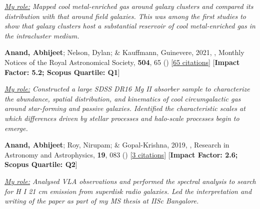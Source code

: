 \vspace{1mm}
\item\textit{\underline{My role:} Mapped cool metal-enriched gas around galaxy clusters and compared its distribution with that around field galaxies. This was among the first studies to show that galaxy clusters host a substantial reservoir of cool metal-enriched gas in the intracluster medium.}
\vspace{1mm}

\item[{\color{numcolor}\scriptsize2}] \textbf{Anand, Abhijeet}; Nelson, Dylan; \& Kauffmann, Guinevere, 2021, , Monthly Notices of the Royal Astronomical Society, \textbf{504}, 65 () [\href{https://ui.adsabs.harvard.edu/abs/2021MNRAS.504...65A}{65 citations}] [\textbf{Impact Factor: 5.2; Scopus Quartile: Q1}]

\vspace{1mm}
\item\textit{\underline{My role:} Constructed a large SDSS DR16 Mg II absorber sample to characterize the abundance, spatial distribution, and kinematics of cool circumgalactic gas around star-forming and passive galaxies. Identified the characteristic scales at which differences driven by stellar processes and halo-scale processes begin to emerge.}
\vspace{1mm}

\item[{\color{numcolor}\scriptsize1}] \textbf{Anand, Abhijeet}; Roy, Nirupam; \& Gopal-Krishna, 2019, , Research in Astronomy and Astrophysics, \textbf{19}, 083 () [\href{https://ui.adsabs.harvard.edu/abs/2019RAA....19...83A}{3 citations}] [\textbf{Impact Factor: 2.6; Scopus Quartile: Q2}]

\vspace{1mm}
\item\textit{\underline{My role:} Analysed VLA observations and performed the spectral analysis to search for H I 21 cm emission from superdisk radio galaxies. Led the interpretation and writing of the paper as part of my MS thesis at IISc Bangalore.}
\vspace{1mm}
